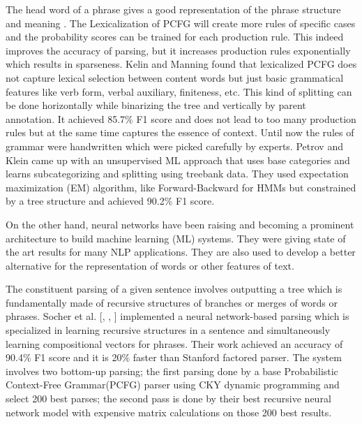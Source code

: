 \documentclass[a4paper, 11pt]{article}
\begin{document}
The head word of a phrase gives a good representation of the phrase structure and meaning \parencite{Charniak_1997}. The Lexicalization of PCFG \parencite{charniak2000} will create more rules of specific cases and the probability scores can be trained for each production rule. This indeed improves the accuracy of parsing, but it increases production rules exponentially which results in sparseness. Kelin and Manning \parencite{kleinunlexical} found that lexicalized PCFG does not capture lexical selection between content words but just basic grammatical features like verb form, verbal auxiliary, finiteness, etc. This kind of splitting can be done horizontally while binarizing the tree and vertically by parent annotation. It achieved 85.7\% F1 score and does not lead to too many production rules but at the same time captures the essence of context. Until now the rules of grammar were handwritten which were picked carefully by experts. Petrov and Klein \parencite{petrov2006} came up with an unsupervised ML approach that uses base categories and learns subcategorizing and splitting using treebank data. They used expectation maximization (EM) algorithm, like Forward-Backward for HMMs but constrained by a tree structure and achieved 90.2\% F1 score. 

On the other hand, neural networks have been raising and becoming a prominent architecture to build machine learning (ML) systems. They were giving state of the art results for many NLP applications. They are also used to develop a better alternative for the representation of words or other features of text. 

The constituent parsing of a given sentence involves outputting a tree which is fundamentally made of recursive structures of branches or merges of words or phrases. Socher et al. [\parencite*{RichardSocher2011}, \parencite*{Socher}, \parencite*{Sochera}] implemented a neural network-based parsing which is specialized in learning recursive structures in a sentence and simultaneously learning compositional vectors for phrases. Their work achieved an accuracy of 90.4\% F1 score and it is 20\% faster than Stanford factored parser. The system involves two bottom-up parsing; the first parsing done by a base Probabilistic Context-Free Grammar(PCFG) parser using CKY dynamic programming and select 200 best parses; the second pass is done by their best recursive neural network model with expensive matrix calculations on those 200 best results. 

\end{document}
